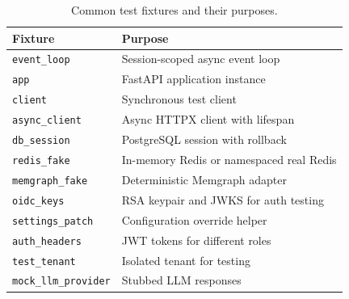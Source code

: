\begin{table}[ht]
\centering
\caption{Common test fixtures and their purposes.}
\label{tab:common-fixtures}
\small
\begin{tabular}{ll}
\hline
\textbf{Fixture} & \textbf{Purpose} \\
\hline
\texttt{event\_loop} & Session-scoped async event loop \\
\texttt{app} & FastAPI application instance \\
\texttt{client} & Synchronous test client \\
\texttt{async\_client} & Async HTTPX client with lifespan \\
\texttt{db\_session} & PostgreSQL session with rollback \\
\texttt{redis\_fake} & In-memory Redis or namespaced real Redis \\
\texttt{memgraph\_fake} & Deterministic Memgraph adapter \\
\texttt{oidc\_keys} & RSA keypair and JWKS for auth testing \\
\texttt{settings\_patch} & Configuration override helper \\
\texttt{auth\_headers} & JWT tokens for different roles \\
\texttt{test\_tenant} & Isolated tenant for testing \\
\texttt{mock\_llm\_provider} & Stubbed LLM responses \\
\hline
\end{tabular}
\end{table}

